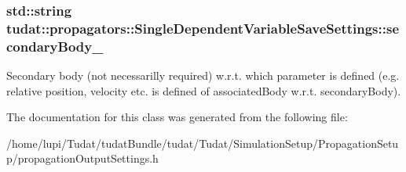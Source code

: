 \subsubsection[{\texorpdfstring{secondary\+Body\+\_\+}{secondaryBody_}}]{\setlength{\rightskip}{0pt plus 5cm}std\+::string tudat\+::propagators\+::\+Single\+Dependent\+Variable\+Save\+Settings\+::secondary\+Body\+\_\+}\hypertarget{classtudat_1_1propagators_1_1SingleDependentVariableSaveSettings_ae753de13467b2d1b065651f3ba7c0633}{}\label{classtudat_1_1propagators_1_1SingleDependentVariableSaveSettings_ae753de13467b2d1b065651f3ba7c0633}
Secondary body (not necessarilly required) w.\+r.\+t. which parameter is defined (e.\+g. relative position, velocity etc. is defined of associated\+Body w.\+r.\+t. secondary\+Body). 

The documentation for this class was generated from the following file\+:\begin{DoxyCompactItemize}
\item 
/home/lupi/\+Tudat/tudat\+Bundle/tudat/\+Tudat/\+Simulation\+Setup/\+Propagation\+Setup/propagation\+Output\+Settings.\+h\end{DoxyCompactItemize}
